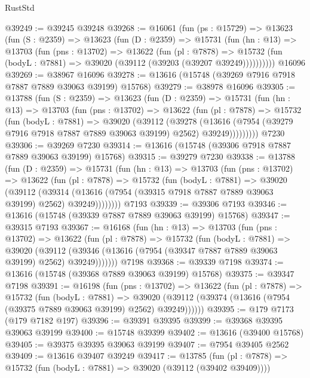 \begin{lexlean}{RustStd}
\begin{coremodule}
@39249 := @39245 @39248
@39268 := @16061
    (fun (ps : @15729) =>
    @13623
      (fun (S : @2359) =>
      @13623
        (fun (D : @2359) =>
        @15731
          (fun (hn : @13) =>
          @13703
            (fun (pns : @13702) =>
            @13622
              (fun (pl : @7878) =>
              @15732 (fun (bodyL : @7881) => @39020 (@39112 (@39203 (@39207 @39249))))))))))
    @16096
@39269 := @38967 @16096
@39278 := @13616 (@15748 (@39269 @7916 @7918 @7887 @7889 @39063 @39199) @15768)
@39279 := @38978 @16096
@39305 := @13788
    (fun (S : @2359) =>
    @13623
      (fun (D : @2359) =>
      @15731
        (fun (hn : @13) =>
        @13703
          (fun (pns : @13702) =>
          @13622
            (fun (pl : @7878) =>
            @15732
              (fun (bodyL : @7881) =>
              @39020
                (@39112
                  (@39278
                    (@13616
                      (@7954 (@39279 @7916 @7918 @7887 @7889 @39063 @39199) @2562)
                      @39249)))))))))
    @7230
@39306 := @39269 @7230
@39314 := @13616 (@15748 (@39306 @7918 @7887 @7889 @39063 @39199) @15768)
@39315 := @39279 @7230
@39338 := @13788
    (fun (D : @2359) =>
    @15731
      (fun (hn : @13) =>
      @13703
        (fun (pns : @13702) =>
        @13622
          (fun (pl : @7878) =>
          @15732
            (fun (bodyL : @7881) =>
            @39020
              (@39112
                (@39314
                  (@13616 (@7954 (@39315 @7918 @7887 @7889 @39063 @39199) @2562) @39249))))))))
    @7193
@39339 := @39306 @7193
@39346 := @13616 (@15748 (@39339 @7887 @7889 @39063 @39199) @15768)
@39347 := @39315 @7193
@39367 := @16168
    (fun (hn : @13) =>
    @13703
      (fun (pns : @13702) =>
      @13622
        (fun (pl : @7878) =>
        @15732
          (fun (bodyL : @7881) =>
          @39020
            (@39112 (@39346 (@13616 (@7954 (@39347 @7887 @7889 @39063 @39199) @2562) @39249)))))))
    @7198
@39368 := @39339 @7198
@39374 := @13616 (@15748 (@39368 @7889 @39063 @39199) @15768)
@39375 := @39347 @7198
@39391 := @16198
    (fun (pns : @13702) =>
    @13622
      (fun (pl : @7878) =>
      @15732
        (fun (bodyL : @7881) =>
        @39020 (@39112 (@39374 (@13616 (@7954 (@39375 @7889 @39063 @39199) @2562) @39249))))))
@39395 := @179 @7173 (@179 @7182 @197)
@39396 := @39391 @39395
@39399 := @39368 @39395 @39063 @39199
@39400 := @15748 @39399
@39402 := @13616 (@39400 @15768)
@39405 := @39375 @39395 @39063 @39199
@39407 := @7954 @39405 @2562
@39409 := @13616 @39407 @39249
@39417 := @13785
    (fun (pl : @7878) => @15732 (fun (bodyL : @7881) => @39020 (@39112 (@39402 @39409))))

\end{coremodule}
\end{lexlean}
